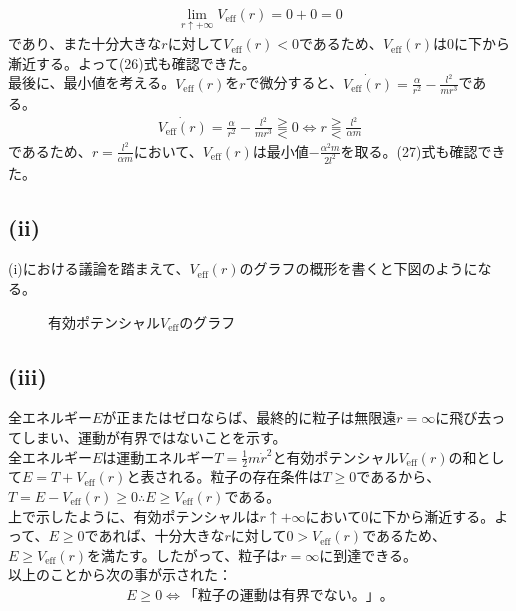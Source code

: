   \begin{align*}
    \lim_{r\uparrow+\infty}V_{\mathrm{eff}}(r)=0+0=0
  \end{align*}
  であり、また十分大きな$r$に対して$V_{\mathrm{eff}}(r)<0$であるため、$V_{\mathrm{eff}}(r)$は0に下から漸近する。よって(26)式も確認できた。\\
  最後に、最小値を考える。$V_{\mathrm{eff}}(r)$を$r$で微分すると、$\dot{V_{\mathrm{eff}}(r)}=\frac{\alpha}{r^2}-\frac{l^2}{mr^3}$である。
  \begin{align*}
    \dot{V_{\mathrm{eff}}(r)}=\frac{\alpha}{r^2}-\frac{l^2}{mr^3}\gtreqqless 0\iff r \gtreqqless \frac{l^2}{\alpha m}
  \end{align*}
  であるため、$r=\frac{l^2}{\alpha m}$において、$V_{\mathrm{eff}}(r)$は最小値$-\frac{\alpha^2 m}{2l^2}$を取る。(27)式も確認できた。

  \subsection*{(ii)}
  (i)における議論を踏まえて、$V_{\mathrm{eff}}(r)$のグラフの概形を書くと下図のようになる。

  \begin{figure}[h]
    \centering
    \caption*{有効ポテンシャル$V_{\mathrm{eff}}$のグラフ}
    \label{fig:veff}
  \end{figure}

  \subsection*{(iii)}
  全エネルギー$E$が正またはゼロならば、最終的に粒子は無限遠$r=\infty$に飛び去ってしまい、運動が有界ではないことを示す。\\
  全エネルギー$E$は運動エネルギー$T=\frac12 m\dot{r}^2$と有効ポテンシャル$V_{\mathrm{eff}}(r)$の和として$E=T+V_{\mathrm{eff}}(r)$と表される。粒子の存在条件は$T\geq0$であるから、$T=E-V_{\mathrm{eff}}(r)\geq0\therefore E\geq V_{\mathrm{eff}}(r)$である。\\
  上で示したように、有効ポテンシャルは$r\uparrow +\infty$において$0$に下から漸近する。よって、$E\geq0$であれば、十分大きな$r$に対して$0>V_{\mathrm{eff}}(r)$であるため、$E\geq V_{\mathrm{eff}}(r)$を満たす。したがって、粒子は$r=\infty$に到達できる。\\
  以上のことから次の事が示された：
  \begin{align*}
    E\geq0\iff 「粒子の運動は有界でない。」。\tag{28}
  \end{align*}

